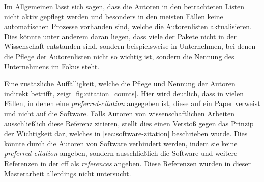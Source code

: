 Im Allgemeinen lässt sich sagen, dass die Autoren in den betrachteten Listen nicht aktiv gepflegt werden und besonders in den meisten Fällen keine automatischen Prozesse vorhanden sind, welche die Autorenlisten aktualisieren.
Dies könnte unter anderem daran liegen, dass viele der Pakete nicht in der Wissenschaft entstanden sind, sondern beispielsweise in Unternehmen, bei denen die Pflege der Autorenlisten nicht so wichtig ist, sondern die Nennung des Unternehmens im Fokus steht.

Eine zusätzliche Auffälligkeit, welche die Pflege und Nennung der Autoren indirekt betrifft, zeigt \autoref{fig:citation_counts}.
Hier wird deutlich, dass in vielen Fällen, in denen eine \emph{preferred-citation} angegeben ist, diese auf ein Paper verweist und nicht auf die Software.
Falls Autoren von wissenschaftlichen Arbeiten ausschließlich diese Referenz zitieren, stellt dies einen Verstoß gegen das Prinzip der Wichtigkeit dar, welches in \autoref{sec:software-zitation} beschrieben wurde.
Dies könnte durch die Autoren von Software verhindert werden, indem sie keine \emph{preferred-citation} angeben, sondern ausschließlich die Software und weitere Referenzen in der \gls{cff} als \emph{references} angeben.
Diese Referenzen wurden in dieser Masterarbeit allerdings nicht untersucht.

